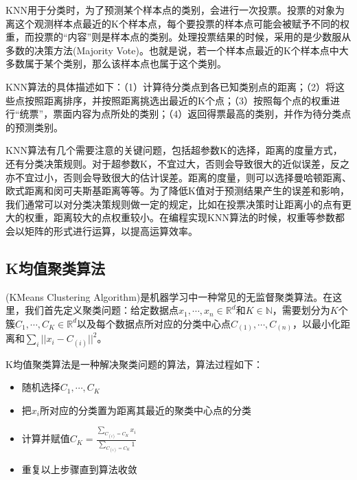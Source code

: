 \documentclass[letterpaper,10pt,english]{sphinxmanual}
\begin{document}
\sphinxAtStartPar
KNN用于分类时，为了预测某个样本点的类别，会进行一次投票。投票的对象为离这个观测样本点最近的K个样本点，每个要投票的样本点可能会被赋予不同的权重，而投票的“内容”则是样本点的类别。处理投票结果的时候，采用的是少数服从多数的决策方法(Majority
Vote)。也就是说，若一个样本点最近的K个样本点中大多数属于某个类别，那么该样本点也属于这个类别。

\sphinxAtStartPar
KNN算法的具体描述如下：（1）计算待分类点到各已知类别点的距离；（2）将这些点按照距离排序，并按照距离挑选出最近的K个点；（3）按照每个点的权重进行“统票”，票面内容为点所处的类别；（4）返回得票最高的类别，并作为待分类点的预测类别。

\sphinxAtStartPar
KNN算法有几个需要注意的关键问题，包括超参数K的选择，距离的度量方式，还有分类决策规则。对于超参数K，不宜过大，否则会导致很大的近似误差，反之亦不宜过小，否则会导致很大的估计误差。距离的度量，则可以选择曼哈顿距离、欧式距离和闵可夫斯基距离等等。为了降低K值对于预测结果产生的误差和影响，我们通常可以对分类决策规则做一定的规定，比如在投票决策时让距离小的点有更大的权重，距离较大的点权重较小。在编程实现KNN算法的时候，权重等参数都会以矩阵的形式进行运算，以提高运算效率。


\subsection{K均值聚类算法}
\label{\detokenize{appendix_machine_learning_introduction/classic_machine_learning:id3}}
\sphinxAtStartPar
{}(K\sphinxhyphen{}Means Clustering
Algorithm)是机器学习中一种常见的无监督聚类算法。在这里，我们首先定义聚类问题：给定数据点\({x_1},\cdots, {x_n} \in \mathbb{R}^d\)和\(K\in \mathbb{N}\)，需要划分为\(K\)个簇\({C_1}, \cdots, {C_K} \in \mathbb{R}^d\)以及每个数据点所对应的分类中心点\({ C_{(1)}}, \cdots, {C_{(n)}}\)，以最小化距离和\(\sum_i ||{x_i} - {C_{(i)}}||^2\)。

\sphinxAtStartPar
K均值聚类算法是一种解决聚类问题的算法，算法过程如下：
\begin{itemize}
\item {} 
\sphinxAtStartPar
随机选择\({C_1}, \cdots, {C_K}\)

\item {} 
\sphinxAtStartPar
把\({x_i}\)所对应的分类置为距离其最近的聚类中心点的分类

\item {} 
\sphinxAtStartPar
计算并赋值\({C_K} = \frac{\sum_{{C_{(i)}}={C_K}} {x_i}}{\sum_{{C_{(i)}}={C_K}} 1}\)

\item {} 
\sphinxAtStartPar
重复以上步骤直到算法收敛

\end{itemize}
\end{document}
